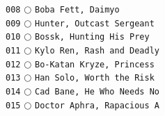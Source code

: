 \documentclass[a4paper,landscape]{article}
\begin{document}
\begin{multicols*}{5}
\texttt{008} \(\bigcirc\)  \texttt{Boba Fett, Daimyo} \vspace{-0.3mm}\\ 
\texttt{009} \(\bigcirc\)  \texttt{Hunter, Outcast Sergeant} \vspace{-0.3mm}\\ 
\texttt{010} \(\bigcirc\)  \texttt{Bossk, Hunting His Prey} \vspace{-0.3mm}\\ 
\texttt{011} \(\bigcirc\)  \texttt{Kylo Ren, Rash and Deadly} \vspace{-0.3mm}\\ 
\texttt{012} \(\bigcirc\)  \texttt{Bo-Katan Kryze, Princess } \vspace{-0.3mm}\\ 
\texttt{013} \(\bigcirc\)  \texttt{Han Solo, Worth the Risk} \vspace{-0.3mm}\\ 
\texttt{014} \(\bigcirc\)  \texttt{Cad Bane, He Who Needs No} \vspace{-0.3mm}\\ 
\texttt{015} \(\bigcirc\)  \texttt{Doctor Aphra, Rapacious A} \vspace{-0.3mm}\\ 

\end{multicols*}
\end{document}
